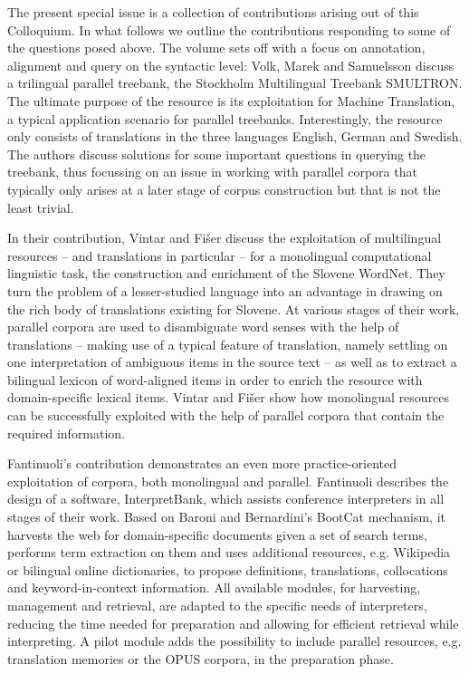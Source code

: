 \documentclass[output=paper]{LSP/langsci}
\begin{document}
The present special issue is a collection of contributions arising out of this Colloquium. In what follows we outline the contributions responding to some of the questions posed above. The volume sets off with a focus on annotation, alignment and query on the syntactic level: Volk, Marek and Samuelsson discuss a trilingual parallel treebank, the Stockholm Multilingual Treebank SMULTRON. The ultimate purpose of the resource is its exploitation for Machine Translation, a typical application scenario for parallel treebanks. Interestingly, the resource only consists of translations in the three languages English, German and Swedish. The authors discuss solutions for some important questions in querying the treebank, thus focussing on an issue in working with parallel corpora that typically only arises at a later stage of corpus construction but that is not the least trivial.

In their contribution, Vintar and Fišer discuss the exploitation of multilingual resources -- and translations in particular -- for a monolingual computational linguistic task, the construction and enrichment of the Slovene WordNet. They turn the problem of a lesser-studied language into an advantage in drawing on the rich body of translations existing for Slovene. At various stages of their work, parallel corpora are used to disambiguate word senses with the help of translations -- making use of a typical feature of translation, namely settling on one interpretation of ambiguous items in the source text -- as well as to extract a bilingual lexicon of word-aligned items in order to enrich the resource with domain-specific lexical items. Vintar and Fišer show how monolingual resources can be successfully exploited with the help of parallel corpora that contain the required information.

Fantinuoli's contribution demonstrates an even more practice-oriented exploitation of corpora, both monolingual and parallel. Fantinuoli describes the design of a software, InterpretBank, which assists conference interpreters in all stages of their work. Based on Baroni and Bernardini's \citet{Baroni2004} BootCat mechanism, it harvests the web for domain-specific documents given a set of search terms, performs term extraction on them and uses additional resources, e.g. Wikipedia or bilingual online dictionaries, to propose definitions, translations, collocations and keyword-in-context information. All available modules, for harvesting, management and retrieval, are adapted to the specific needs of interpreters, reducing the time needed for preparation and allowing for efficient retrieval while interpreting. A pilot module adds the possibility to include parallel resources, e.g. translation memories or the OPUS corpora, in the preparation phase.
\end{document}
